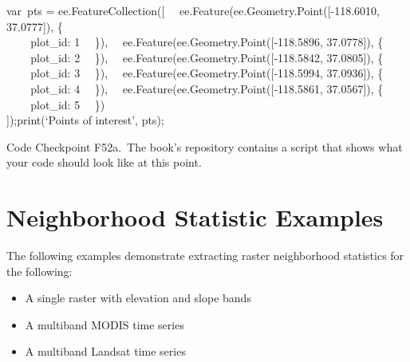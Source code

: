 \documentclass[
  letterpaper,
  DIV=11,
  numbers=noendperiod]{scrreprt}
\providecommand{\tightlist}{%
  \setlength{\itemsep}{0pt}\setlength{\parskip}{0pt}}\usepackage{longtable,booktabs,array}
\begin{document}
var~pts = ee.FeatureCollection({[}~
~ee.Feature(ee.Geometry.Point({[}-118.6010, 37.0777{]}), \{\\
\hspace*{0.333em} ~ ~ ~plot\_id: 1~ ~\}),~
~ee.Feature(ee.Geometry.Point({[}-118.5896, 37.0778{]}), \{\\
\hspace*{0.333em} ~ ~ ~plot\_id: 2~ ~\}),~
~ee.Feature(ee.Geometry.Point({[}-118.5842, 37.0805{]}), \{\\
\hspace*{0.333em} ~ ~ ~plot\_id: 3~ ~\}),~
~ee.Feature(ee.Geometry.Point({[}-118.5994, 37.0936{]}), \{\\
\hspace*{0.333em} ~ ~ ~plot\_id: 4~ ~\}),~
~ee.Feature(ee.Geometry.Point({[}-118.5861, 37.0567{]}), \{\\
\hspace*{0.333em} ~ ~ ~plot\_id: 5~ ~\})\\
{]});print(`Points of interest', pts);

\begin{tcolorbox}[enhanced jigsaw, left=2mm, breakable, rightrule=.15mm, opacityback=0, colframe=quarto-callout-note-color-frame, colbacktitle=quarto-callout-note-color!10!white, arc=.35mm, opacitybacktitle=0.6, toptitle=1mm, colback=white, leftrule=.75mm, title=\textcolor{quarto-callout-note-color}{\faInfo}\hspace{0.5em}{Note}, toprule=.15mm, bottomtitle=1mm, titlerule=0mm, bottomrule=.15mm, coltitle=black]

Code Checkpoint F52a.~The book's repository contains a script that shows
what your code should look like at this point.

\end{tcolorbox}

\hypertarget{neighborhood-statistic-examples}{%
\section{Neighborhood Statistic
Examples}\label{neighborhood-statistic-examples}}

The following examples demonstrate extracting raster neighborhood
statistics for the following:

\begin{itemize}
\tightlist
\item
  A single raster with elevation and slope bands
\item
  A multiband MODIS time series
\item
  A multiband Landsat time series
\end{itemize}
\end{document}
